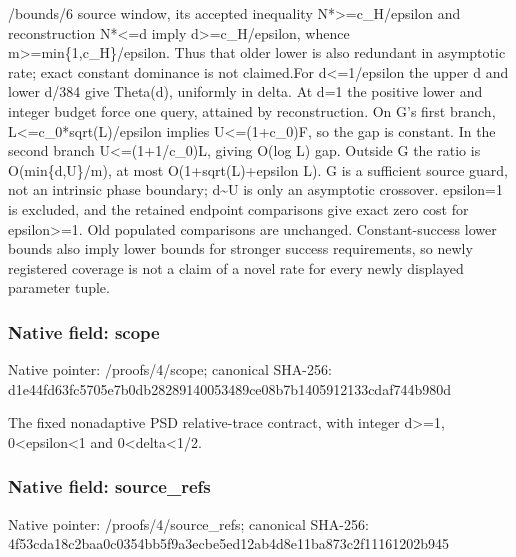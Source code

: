 \documentclass[10pt,a4paper]{article}
\begin{document}
/\allowbreak{}bounds/\allowbreak{}6 source window,\allowbreak{} its accepted inequality N*>=\allowbreak{}c\_\allowbreak{}H/\allowbreak{}epsilon and reconstruction N*<=\allowbreak{}d imply d>=\allowbreak{}c\_\allowbreak{}H/\allowbreak{}epsilon,\allowbreak{} whence m>=\allowbreak{}min\{1,\allowbreak{}c\_\allowbreak{}H\}/\allowbreak{}epsilon. Thus that older lower is also redundant in asymptotic rate;\allowbreak{} exact constant dominance is not claimed.\newline{}For d<=\allowbreak{}1/\allowbreak{}epsilon the upper d and lower d/\allowbreak{}384 give Theta(d),\allowbreak{} uniformly in delta. At d=\allowbreak{}1 the positive lower and integer budget force one query,\allowbreak{} attained by reconstruction. On G's first branch,\allowbreak{} L<=\allowbreak{}c\_\allowbreak{}0*sqrt(L)/\allowbreak{}epsilon implies U<=\allowbreak{}(1+c\_\allowbreak{}0)F,\allowbreak{} so the gap is constant. In the second branch U<=\allowbreak{}(1+1/\allowbreak{}c\_\allowbreak{}0)L,\allowbreak{} giving O(log L) gap. Outside G the ratio is O(min\{d,\allowbreak{}U\}/\allowbreak{}m),\allowbreak{} at most O(1+sqrt(L)+epsilon L). G is a sufficient source guard,\allowbreak{} not an intrinsic phase boundary;\allowbreak{} d\textasciitilde{}U is only an asymptotic crossover. epsilon=\allowbreak{}1 is excluded,\allowbreak{} and the retained endpoint comparisons give exact zero cost for epsilon>=\allowbreak{}1. Old populated comparisons are unchanged. Constant-success lower bounds also imply lower bounds for stronger success requirements,\allowbreak{} so newly registered coverage is not a claim of a novel rate for every newly displayed parameter tuple.\par\endgroup

\subsubsection{Native field: scope}
Native pointer: /proofs/4/scope; canonical SHA-256: d1e44fd63fc5705e7b0db28289140053489ce08b7b1405912133cdaf744b980d

\begingroup\raggedright\sloppy The fixed nonadaptive PSD relative-trace contract,\allowbreak{} with integer d>=\allowbreak{}1,\allowbreak{} 0<epsilon<1 and 0<delta<1/\allowbreak{}2.\par\endgroup

\subsubsection{Native field: source\_\allowbreak{}refs}
Native pointer: /proofs/4/source\_\allowbreak{}refs; canonical SHA-256: 4f53cda18c2baa0c0354bb5f9a3ecbe5ed12ab4d8e11ba873c2f11161202b945
\end{document}
